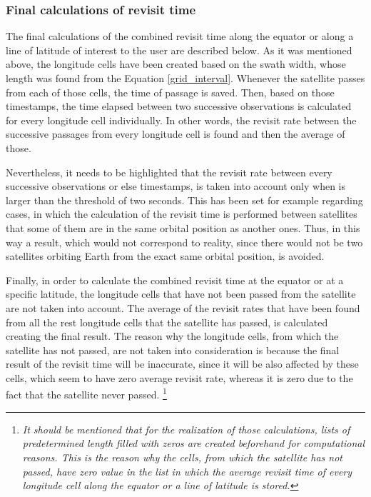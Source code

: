 \bigskip
\subsubsection{Final calculations of revisit time}
\bigskip

The final calculations of the combined revisit time along the equator or along a line of latitude of interest to the user are described below. As it was mentioned above, the longitude cells have been created based on the swath width, whose length was found from the Equation \ref{grid_interval}. Whenever the satellite passes from each of those cells, the time of passage is saved. Then, based on those timestamps, the time elapsed between two successive observations is calculated for every longitude cell individually. In other words, the revisit rate between the successive passages from every longitude cell is found and then the average of those.

Nevertheless, it needs to be highlighted that the revisit rate between every successive observations or else timestamps, is taken into account only when is larger than the threshold of two seconds. This has been set for example regarding cases, in which the calculation of the revisit time is performed between satellites that some of them are in the same orbital position as another ones. Thus, in this way a result, which would not correspond to reality, since there would not be two satellites orbiting Earth from the exact same orbital position, is avoided.

Finally, in order to calculate the combined revisit time at the equator or at a specific latitude, the longitude cells that have not been passed from the satellite are not taken into account. The average of the revisit rates that have been found from all the rest longitude cells that the satellite has passed, is calculated creating the final result. The reason why the longitude cells, from which the satellite has not passed, are not taken into consideration is because the final result of the revisit time will be inaccurate, since it will be also affected by these cells, which seem to have zero average revisit rate, whereas it is zero due to the fact that the satellite never passed. \footnote{\label{Flock_source}\textit{It should be mentioned that for the realization of those calculations, lists of predetermined length filled with zeros are created beforehand for computational reasons. This is the reason why the cells, from which the satellite has not passed, have zero value in the list in which the average revisit time of every longitude cell along the equator or a line of latitude is stored.}}


